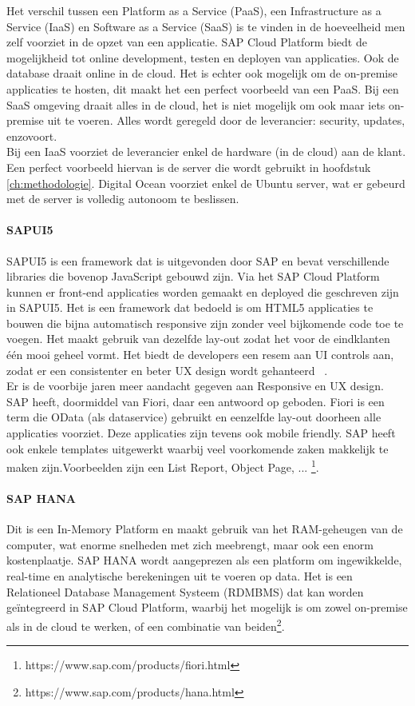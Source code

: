     Het verschil tussen een Platform as a Service (PaaS), een Infrastructure as a Service (IaaS) en Software as a Service (SaaS) is te vinden in de hoeveelheid men zelf voorziet in de opzet van een applicatie. SAP Cloud Platform biedt de mogelijkheid tot online development, testen en deployen van applicaties. Ook de database draait online in de cloud. Het is echter ook mogelijk om de on-premise applicaties te hosten, dit maakt het een perfect voorbeeld van een PaaS. Bij een SaaS omgeving draait alles in de cloud, het is niet mogelijk om ook maar iets on-premise uit te voeren. Alles wordt geregeld door de leverancier: security, updates, enzovoort.\\
    Bij een IaaS voorziet de leverancier enkel de hardware (in de cloud) aan de klant. Een perfect voorbeeld hiervan is de server die wordt gebruikt in hoofdstuk \ref{ch:methodologie}. Digital Ocean voorziet enkel de Ubuntu server, wat er gebeurd met de server is volledig autonoom te beslissen.
    
    \paragraph{SAPUI5}
    SAPUI5 is een framework dat is uitgevonden door SAP en bevat verschillende libraries die bovenop JavaScript gebouwd zijn. Via het SAP Cloud Platform kunnen er front-end applicaties worden gemaakt en deployed die geschreven zijn in SAPUI5. Het is een framework dat bedoeld is om HTML5 applicaties te bouwen die bijna automatisch responsive zijn zonder veel bijkomende code toe te voegen.
    Het maakt gebruik van dezelfde lay-out zodat het voor de eindklanten één mooi geheel vormt. Het biedt de developers een resem aan UI controls aan, zodat er een consistenter en beter UX design wordt gehanteerd ~\autocite{SAPSEa}. \\
    Er is de voorbije jaren meer aandacht gegeven aan Responsive en UX design. SAP heeft, doormiddel van Fiori, daar een antwoord op geboden. Fiori is een term die OData (als dataservice) gebruikt en eenzelfde lay-out doorheen alle applicaties voorziet. Deze applicaties zijn tevens ook mobile friendly. SAP heeft ook enkele templates uitgewerkt waarbij veel voorkomende zaken makkelijk te maken zijn.Voorbeelden zijn een List Report, Object Page, ... \footnote{https://www.sap.com/products/fiori.html}.
    
    \paragraph{SAP HANA}
    Dit is een In-Memory Platform en maakt gebruik van het RAM-geheugen van de computer, wat enorme snelheden met zich meebrengt, maar ook een enorm kostenplaatje. SAP HANA wordt aangeprezen als een platform om ingewikkelde, real-time en analytische berekeningen uit te voeren op data.
    Het is een Relationeel Database Management Systeem (RDMBMS) dat kan worden geïntegreerd in SAP Cloud Platform, waarbij het mogelijk is om zowel on-premise als in de cloud te werken, of een combinatie van beiden\footnote{https://www.sap.com/products/hana.html}.
